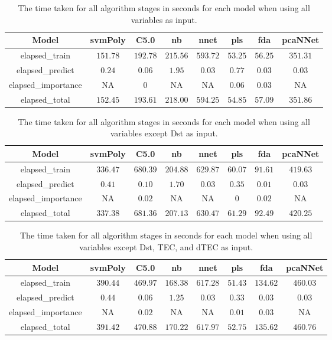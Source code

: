 \begin{table}[!ht]
	\centering
	\begin{tabular}{|c|c|c|c|c|c|c|c|}
		\hline
		Model & svmPoly & C5.0 & nb & nnet & pls & fda & pcaNNet \\ \hline
		elapsed_train & $151.78$ & $192.78$ & $215.56$ & $593.72$ & $53.25$ & $56.25$ & $351.31$ \\ \hline
		elapsed_predict & $0.24$ & $0.06$ & $1.95$ & $0.03$ & $0.77$ & $0.03$ & $0.03$ \\ \hline
		elapsed_importance & NA & $0$ & NA & NA & $0.06$ & $0.03$ & NA \\ \hline
		elapsed_total & $152.45$ & $193.61$ & $218.00$ & $594.25$ & $54.85$ & $57.09$ & $351.86$ \\ \hline
	\end{tabular}
	\caption{The time taken for all algorithm stages in seconds for each model when using all variables as input.}
	\label{tab:time:reverse:all}
\end{table}

\begin{table}[!ht]
	\centering
	\begin{tabular}{|c|c|c|c|c|c|c|c|}
		\hline
		Model & svmPoly & C5.0 & nb & nnet & pls & fda & pcaNNet \\ \hline
		elapsed_train & $336.47$ & $680.39$ & $204.88$ & $629.87$ & $60.07$ & $91.61$ & $419.63$ \\ \hline
		elapsed_predict & $0.41$ & $0.10$ & $1.70$ & $0.03$ & $0.35$ & $0.01$ & $0.03$ \\ \hline
		elapsed_importance & NA & $0.02$ & NA & NA & $0$ & $0.02$ & NA \\ \hline
		elapsed_total & $337.38$ & $681.36$ & $207.13$ & $630.47$ & $61.29$ & $92.49$ & $420.25$ \\ \hline
	\end{tabular}
	\caption{The time taken for all algorithm stages in seconds for each model when using all variables except Dst as input.}
	\label{tab:time:reverse:noDst}
\end{table}

\begin{table}[!ht]
	\centering
	\begin{tabular}{|c|c|c|c|c|c|c|c|}
		\hline
		Model & svmPoly & C5.0 & nb & nnet & pls & fda & pcaNNet \\ \hline
		elapsed_train & $390.44$ & $469.97$ & $168.38$ & $617.28$ & $51.43$ & $134.62$ & $460.03$ \\ \hline
		elapsed_predict & $0.44$ & $0.06$ & $1.25$ & $0.03$ & $0.33$ & $0.03$ & $0.03$ \\ \hline
		elapsed_importance & NA & $0.02$ & NA & NA & $0.01$ & $0.03$ & NA \\ \hline
		elapsed_total & $391.42$ & $470.88$ & $170.22$ & $617.97$ & $52.75$ & $135.62$ & $460.76$ \\ \hline
	\end{tabular}
	\caption{The time taken for all algorithm stages in seconds for each model when using all variables except Dst, TEC, and dTEC as input.}
	\label{tab:time:reverse:noTEC}
\end{table}

